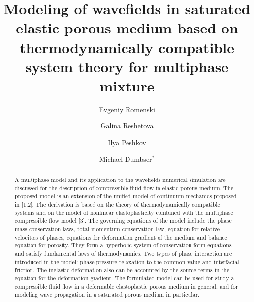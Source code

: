 \documentclass[3p,times]{elsarticle}
\begin{document}
 
\begin{frontmatter}
\title{Modeling of wavefields in saturated elastic porous medium based on thermodynamically compatible system theory for multiphase mixture } 
\author[NSC,NSU]{Evgeniy Romenski}

\author[ICMMG]{Galina Reshetova}
 
\author[IMT,NSC]{Ilya Peshkov}

\author[UniTN]{Michael Dumbser$^{*}$}



\address[NSC]{{Sobolev Institute of Mathematics, 4 Acad. Koptyug Avenue, 630090 Novosibirsk, Russia}}
\address[ICMMG]{{Institute of Computational Mathematics and Mathematical Geophysics, 6 Pr. Akademika Lavrentjeva, 630090 Novosibirsk, Russia}}
\address[NSU]{{Novosibirsk State University, 2 Pirogova Str., 630090 Novosibirsk, Russia}}
\address[IMT]{{Institut de Math\'{e}matiques de Toulouse, Universit\'{e} Toulouse III, F-31062 Toulouse, France.}}
\address[UniTN]{Department of Civil, Environmental and Mechanical Engineering, 
University of Trento, Via Mesiano 77, 38123 Trento, Italy.} 

\begin{abstract} \color[rgb]{0,0,0}
A multiphase model and its application to the wavefields numerical simulation are discussed for the description of compressible fluid flow in elastic porous medium. The proposed model is an extension of the unified model of continuum mechanics proposed in [1,2]. The derivation is based on the theory of thermodynamically compatible systems and on the model of nonlinear elastoplasticity combined with the multiphase compressible flow model [3]. The governing equations of the model include the phase mass conservation laws, total momentum conservation law, equation for relative velocities of phases, equations for deformation gradient of the medium and balance equation for porosity. They form a hyperbolic system of conservation form equations and satisfy fundamental laws of thermodynamics. Two types of phase interaction are introduced in the model: phase pressure relaxation to the common value and interfacial friction. The inelastic deformation also can be accounted by the source terms in the equation for the deformation gradient. The formulated model can be used for study a compressible fluid flow in a deformable elastoplastic porous medium in general, and for modeling wave propagation in a saturated porous medium in particular. 


\end{abstract}
\end{frontmatter}
\end{document}
